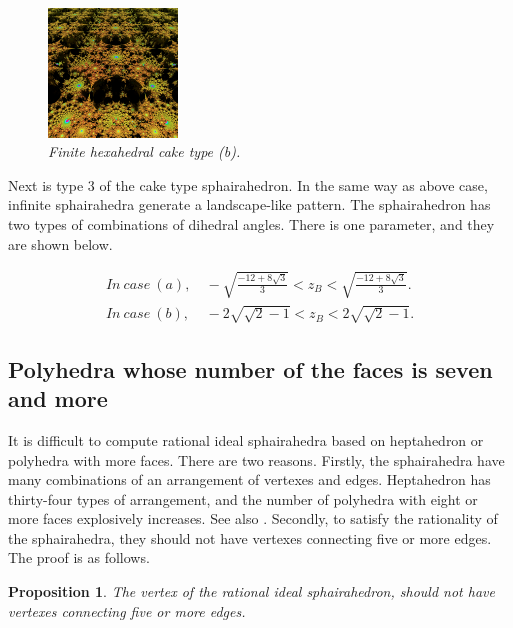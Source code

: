 \documentclass[suppldata, dvipdfmx]{interact}
\theoremstyle{plain}%
\newtheorem{proposition}[theorem]{Proposition}
\theoremstyle{definition}
\theoremstyle{remark}
\theoremstyle{problemstyle}
\begin{document}
\begin{figure}[H]
\begin{minipage}{0.5\textwidth}
  \begin{minipage}[t]{0.24\textwidth}
   \centering
   \includegraphics[width=1.35in, height=1.35in,
   keepaspectratio]{./img/sphairahedron/hexahedralCake3/limitsetInf_b.png} 
  \end{minipage}
  \hspace*{\fill}
  \caption{\textit{Finite hexahedral cake type (b).}}
  \label{}
 \end{minipage}
\end{figure}

Next is type 3 of the cake type sphairahedron.
In the same way as above case, infinite sphairahedra generate a landscape-like pattern.
The sphairahedron has two types of combinations of dihedral angles.
There is one parameter, and they are shown below.

\begin{align*}
   In~case~(a),&~-\sqrt{\frac{-12 + 8 \sqrt{3}}{3}} < z_B < \sqrt{\frac{-12 + 8 \sqrt{3}}{3}}.\\
   In~case~(b),&~-2\sqrt{\sqrt{2} - 1} < z_B < 2\sqrt{\sqrt{2} -1}.
\end{align*}



\subsection{Polyhedra whose number of the faces is seven and more}

It is difficult to compute rational ideal sphairahedra based on
heptahedron or polyhedra with more faces.
There are two reasons.
Firstly, the sphairahedra have many combinations of an arrangement of
vertexes and edges. 
Heptahedron has thirty-four types of arrangement, and
the number of polyhedra with eight or more faces explosively
increases. See also \cite{countingPolyhedra}.
Secondly, to satisfy the rationality of the sphairahedra, they should not
have vertexes connecting five or more edges.
The proof is as follows.

\begin{proposition}
 The vertex of the rational ideal sphairahedron, should not
 have vertexes connecting five or more edges.
\end{proposition}
\end{document}
